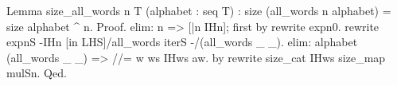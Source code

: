 \begin{Answer}[ref=ex:induction2]

\begin{coq}{}{}
Lemma size_all_words n T (alphabet : seq T) :
  size (all_words n alphabet) = size alphabet ^ n.
Proof.
elim: n => [|n IHn]; first by rewrite expn0.
rewrite expnS -{}IHn [in LHS]/all_words iterS -/(all_words _ _).
elim: alphabet (all_words _ _) => //= w ws IHws aw.
by rewrite size_cat IHws size_map mulSn.
Qed.
\end{coq}
\end{Answer}














